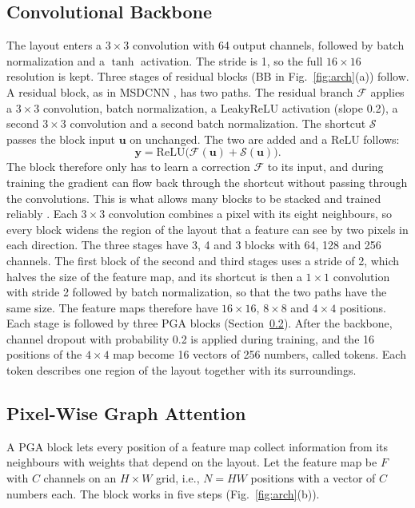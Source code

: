 \documentclass[journal]{IEEEtran}
\begin{document}
\subsection{Convolutional Backbone}
The layout enters a $3\times3$ convolution with 64 output channels, followed by batch normalization \cite{batchnorm} and a $\tanh$ activation. The stride is 1, so the full $16\times16$ resolution is kept. Three stages of residual blocks \cite{resnet} (BB in Fig.~\ref{fig:arch}(a)) follow. A residual block, as in MSDCNN \cite{msdcnn}, has two paths. The residual branch $\mathcal F$ applies a $3\times3$ convolution, batch normalization, a LeakyReLU activation (slope 0.2), a second $3\times3$ convolution and a second batch normalization. The shortcut $\mathcal S$ passes the block input $\mathbf u$ on unchanged. The two are added and a ReLU follows:
\begin{equation}
\mathbf y=\mathrm{ReLU}\big(\mathcal F(\mathbf u)+\mathcal S(\mathbf u)\big).
\end{equation}
The block therefore only has to learn a correction $\mathcal F$ to its input, and during training the gradient can flow back through the shortcut without passing through the convolutions. This is what allows many blocks to be stacked and trained reliably \cite{resnet}. Each $3\times3$ convolution combines a pixel with its eight neighbours, so every block widens the region of the layout that a feature can see by two pixels in each direction. The three stages have 3, 4 and 3 blocks with 64, 128 and 256 channels. The first block of the second and third stages uses a stride of 2, which halves the size of the feature map, and its shortcut is then a $1\times1$ convolution with stride 2 followed by batch normalization, so that the two paths have the same size. The feature maps therefore have $16\times16$, $8\times8$ and $4\times4$ positions. Each stage is followed by three PGA blocks (Section~\ref{sec:pga}). After the backbone, channel dropout with probability 0.2 is applied during training, and the 16 positions of the $4\times4$ map become 16 vectors of 256 numbers, called tokens. Each token describes one region of the layout together with its surroundings.

\subsection{Pixel-Wise Graph Attention}\label{sec:pga}
A PGA block \cite{pganet} lets every position of a feature map collect information from its neighbours with weights that depend on the layout. Let the feature map be $F$ with $C$ channels on an $H\times W$ grid, i.e., $N=HW$ positions with a vector of $C$ numbers each. The block works in five steps (Fig.~\ref{fig:arch}(b)).
\end{document}
